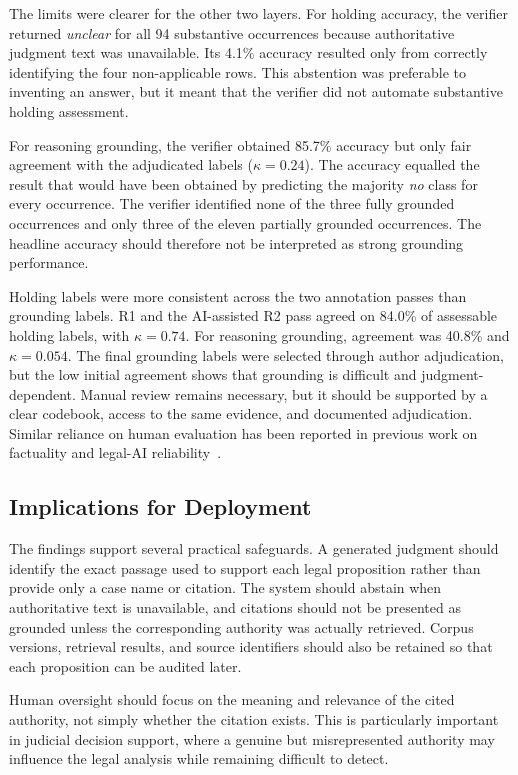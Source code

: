 \documentclass[conference]{IEEEtran}
\begin{document}
The limits were clearer for the other two layers. For holding accuracy, the verifier returned \textit{unclear} for all 94 substantive occurrences because authoritative judgment text was unavailable. Its 4.1\% accuracy resulted only from correctly identifying the four non-applicable rows. This abstention was preferable to inventing an answer, but it meant that the verifier did not automate substantive holding assessment.

For reasoning grounding, the verifier obtained 85.7\% accuracy but only fair agreement with the adjudicated labels ($\kappa = 0.24$). The accuracy equalled the result that would have been obtained by predicting the majority \textit{no} class for every occurrence. The verifier identified none of the three fully grounded occurrences and only three of the eleven partially grounded occurrences. The headline accuracy should therefore not be interpreted as strong grounding performance.

Holding labels were more consistent across the two annotation passes than grounding labels. R1 and the AI-assisted R2 pass agreed on 84.0\% of assessable holding labels, with $\kappa = 0.74$. For reasoning grounding, agreement was 40.8\% and $\kappa = 0.054$. The final grounding labels were selected through author adjudication, but the low initial agreement shows that grounding is difficult and judgment-dependent. Manual review remains necessary, but it should be supported by a clear codebook, access to the same evidence, and documented adjudication. Similar reliance on human evaluation has been reported in previous work on factuality and legal-AI reliability~\cite{maynez2020,magesh2024}.

\subsection{Implications for Deployment}

The findings support several practical safeguards. A generated judgment should identify the exact passage used to support each legal proposition rather than provide only a case name or citation. The system should abstain when authoritative text is unavailable, and citations should not be presented as grounded unless the corresponding authority was actually retrieved. Corpus versions, retrieval results, and source identifiers should also be retained so that each proposition can be audited later.

Human oversight should focus on the meaning and relevance of the cited authority, not simply whether the citation exists. This is particularly important in judicial decision support, where a genuine but misrepresented authority may influence the legal analysis while remaining difficult to detect.
\end{document}
